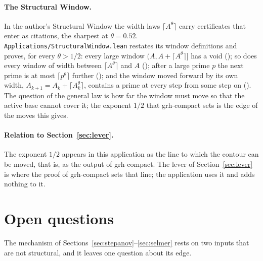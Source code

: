 \documentclass[11pt]{article}
\theoremstyle{definition}
\theoremstyle{remark}
\begin{document}
\paragraph{The Structural Window.} In the author's Structural Window the width laws
$\lceil A^\theta\rceil$ carry certificates that enter as citations, the sharpest at $\theta=0.52$.
\texttt{Applications/StructuralWindow.lean} restates its window definitions and proves, for every
$\theta>1/2$: every large window $(A,A+\lceil A^\theta\rceil]$ has a void
(); so does every window of width between
$\lceil A^\theta\rceil$ and $A$ (); after a large prime
$p$ the next prime is at most $\lceil p^\theta\rceil$ further
(); and the window moved forward by its own width,
$A_{k+1}=A_k+\lceil A_k^\theta\rceil$, contains a prime at every step from some step on
(). The question of the general law is how far the window must move
so that the active base cannot cover it; the exponent $1/2$ that grh-compact sets is the edge of
the moves this gives.

\paragraph{Relation to Section~\ref{sec:lever}.} The exponent $1/2$ appears in this application as
the line to which the contour can be moved, that is, as the output of grh-compact. The lever of
Section~\ref{sec:lever} is where the proof of grh-compact sets that line; the application uses it
and adds nothing to it.

\section{Open questions}\label{sec:open}

The mechanism of Sections~\ref{sec:stepanov}--\ref{sec:selmer} rests on two inputs that are not
structural, and it leaves one question about its edge.
\end{document}
